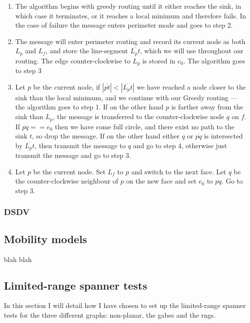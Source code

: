 \begin{enumerate}
\item The algorithm begins with greedy routing until it either reaches the sink, in which case it terminates, or it reaches a local minimum and therefore fails. In the case of failure the message enters perimeter mode and goes to step 2.
\item The message will enter perimeter routing and record its current node as both $L_p$ and $L_f$, and store the line-segment $\overline{L_pt}$, which we will use throughout our routing. The edge counter-clockwise to $L_p$ is stored in $e_0$. The algorithm goes to step 3
\item Let $p$ be the current node, if $|\overline{pt}| < |\overline{L_pt}|$ we have reached a node closer to the sink than the local minimum, and we continue with our Greedy routing --- the algorithm goes to step 1. If on the other hand $p$ is farther away from the sink than $L_p$, the message is transferred to the counter-clockwise node $q$ on $f$. If $\overline{pq} == e_0$ then we have come full circle, and there exist no path to the sink $t$, so drop the message. If on the other hand either $q$ or $\overline{pq}$ is intersected by $\overline{L_pt}$, then transmit the message to $q$ and go to step 4, otherwise just transmit the message and go to step 3.
\item Let $p$ be the current node. Set $L_f$ to $p$ and switch to the next face. Let $q$ be the counter-clockwise neighbour of $p$ on the new face and set $e_0$ to $\overline{pq}$. Go to step 3. 
\end{enumerate}

\subsubsection{DSDV}


\subsection{Mobility models}


blah blah



\subsection{Limited-range spanner tests}
\label{section:test_desc_spanners}
In this section I will detail how I have chosen to set up the limited-range spanner tests for the three different graphs: non-planar, the \acp{gabe} and the \acp{rng}.


